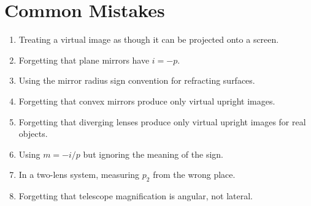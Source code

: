 \documentclass{studentnotes}
\begin{document}
\section{Common Mistakes}

\begin{enumerate}
    \item Treating a virtual image as though it can be projected onto a screen.
    \item Forgetting that plane mirrors have \(i=-p\).
    \item Using the mirror radius sign convention for refracting surfaces.
    \item Forgetting that convex mirrors produce only virtual upright images.
    \item Forgetting that diverging lenses produce only virtual upright images
    for real objects.
    \item Using \(m=-i/p\) but ignoring the meaning of the sign.
    \item In a two-lens system, measuring \(p_2\) from the wrong place.
    \item Forgetting that telescope magnification is angular, not lateral.
\end{enumerate}
\end{document}
